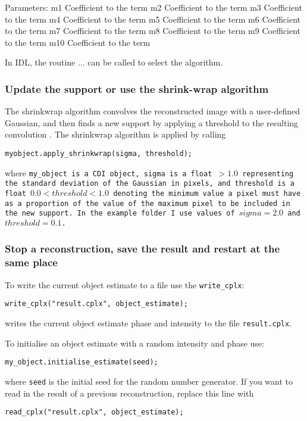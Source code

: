\documentclass[]{nadia}
\begin{document}
Parameters:
m1 	Coefficient to the  term
m2 	Coefficient to the  term
m3 	Coefficient to the  term
m4 	Coefficient to the  term
m5 	Coefficient to the  term
m6 	Coefficient to the  term
m7 	Coefficient to the  term
m8 	Coefficient to the  term
m9 	Coefficient to the  term
m10 	Coefficient to the  term




In IDL, the routine ... can be called to select the algorithm.


\subsubsection{Update the support or use the shrink-wrap algorithm}

The shrinkwrap algorithm convolves the reconstructed image with a user-defined Gaussian, and then finds a new support by applying a threshold to the resulting convolution \cite{marchesini:03}. The shrinkwrap algorithm is applied by  calling

\begin{verbatim}
myobject.apply_shrinkwrap(sigma, threshold);
\end{verbatim}

where \tt{my\_object} is a CDI object, {\tt sigma} is a float $>1.0$ representing the standard deviation of the Gaussian in pixels, and {\tt threshold} is a float $0.0<threshold<1.0$ denoting the minimum value a pixel must have as a proportion of the value of the maximum pixel to be included in the new support. In the example folder I use values of $sigma = 2.0$ and $threshold = 0.1$. 

\subsubsection{Stop a reconstruction, save the result and restart at the same place}\label{subsubsec:read_images}

To write the current object estimate to a file use the {\tt write{\_}cplx}:

\begin{verbatim}
write_cplx("result.cplx", object_estimate);
\end{verbatim}
writes the current object estimate phase and intensity to the file {\tt result.cplx}.

To initialise an object estimate with a random intensity and phase use: 
\begin{verbatim}
my_object.initialise_estimate(seed);
\end{verbatim}
where {\tt seed} is the initial seed for the random number generator. If you want to read in the result of a previous reconstruction, replace this line with 
\begin{verbatim}
read_cplx("result.cplx", object_estimate);
\end{verbatim}
\end{document}
